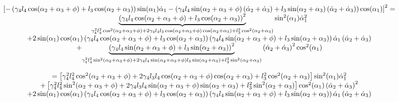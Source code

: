 \documentclass{article}
\begin{document}
\[
\begin{array}{c}
\left[ -\left( \gamma _{4}l_{4}\cos (\alpha _{2}+\alpha _{3}+\phi
)+l_{3}\cos (\alpha _{2}+\alpha _{3})\right) \sin (\alpha _{1})\dot{\alpha}%
_{1}-\left( \gamma _{4}l_{4}\sin (\alpha _{2}+\alpha _{3}+\phi )\left( \dot{%
\alpha}_{2}+\dot{\alpha}_{3}\right) +l_{3}\sin (\alpha _{2}+\alpha
_{3})\left( \dot{\alpha}_{2}+\dot{\alpha}_{3}\right) \right) \cos (\alpha
_{1})\right] ^{2}= \\ 
\underset{\gamma _{4}^{2}l_{4}^{2}\cos ^{2}(\alpha _{2}+\alpha _{3}+\phi
)+2\gamma _{4}l_{4}l_{3}\cos (\alpha _{2}+\alpha _{3}+\phi )\cos (\alpha
_{2}+\alpha _{3})+l_{3}^{2}\cos ^{2}(\alpha _{2}+\alpha _{3})}{\underbrace{%
\left( \gamma _{4}l_{4}\cos (\alpha _{2}+\alpha _{3}+\phi )+l_{3}\cos
(\alpha _{2}+\alpha _{3})\right) ^{2}}}\sin ^{2}(\alpha _{1})\dot{\alpha}%
_{1}^{2} \\ 
+2\sin (\alpha _{1})\cos (\alpha _{1})\left( \gamma _{4}l_{4}\cos (\alpha
_{2}+\alpha _{3}+\phi )+l_{3}\cos (\alpha _{2}+\alpha _{3})\right) \left(
\gamma _{4}l_{4}\sin (\alpha _{2}+\alpha _{3}+\phi )+l_{3}\sin (\alpha
_{2}+\alpha _{3})\right) \dot{\alpha}_{1}\left( \dot{\alpha}_{2}+\dot{\alpha}%
_{3}\right)  \\ 
+\underset{\gamma _{4}^{2}l_{4}^{2}\sin ^{2}(\alpha _{2}+\alpha _{3}+\phi
)+2\gamma _{4}l_{4}\sin (\alpha _{2}+\alpha _{3}+\phi )l_{3}\sin (\alpha
_{2}+\alpha _{3})+l_{3}^{2}\sin ^{2}(\alpha _{2}+\alpha _{3})}{\underbrace{%
\left( \gamma _{4}l_{4}\sin (\alpha _{2}+\alpha _{3}+\phi )+l_{3}\sin
(\alpha _{2}+\alpha _{3})\right) ^{2}}}\left( \dot{\alpha}_{2}+\dot{\alpha}%
_{3}\right) ^{2}\cos ^{2}(\alpha _{1}) \\ 
\\ 
=\left[ \gamma _{4}^{2}l_{4}^{2}\cos ^{2}(\alpha _{2}+\alpha _{3}+\phi
)+2\gamma _{4}l_{3}l_{4}\cos (\alpha _{2}+\alpha _{3}+\phi )\cos (\alpha
_{2}+\alpha _{3})+l_{3}^{2}\cos ^{2}(\alpha _{2}+\alpha _{3})\right] \sin
^{2}(\alpha _{1})\dot{\alpha}_{1}^{2} \\ 
+\left[ \gamma _{4}^{2}l_{4}^{2}\sin ^{2}(\alpha _{2}+\alpha _{3}+\phi
)+2\gamma _{4}l_{3}l_{4}\sin (\alpha _{2}+\alpha _{3}+\phi )\sin (\alpha
_{2}+\alpha _{3})+l_{3}^{2}\sin ^{2}(\alpha _{2}+\alpha _{3})\right] \cos
^{2}(\alpha _{1})\left( \dot{\alpha}_{2}+\dot{\alpha}_{3}\right) ^{2} \\ 
+2\sin (\alpha _{1})\cos (\alpha _{1})\left( \gamma _{4}l_{4}\cos (\alpha
_{2}+\alpha _{3}+\phi )+l_{3}\cos (\alpha _{2}+\alpha _{3})\right) \left(
\gamma _{4}l_{4}\sin (\alpha _{2}+\alpha _{3}+\phi )+l_{3}\sin (\alpha
_{2}+\alpha _{3})\right) \dot{\alpha}_{1}\left( \dot{\alpha}_{2}+\dot{\alpha}%
_{3}\right) 
\end{array}%
\]
\end{document}
